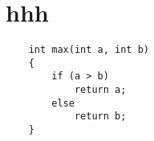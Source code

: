 \chapter{hhh}
\begin{lstlisting}
    int max(int a, int b)
    {
        if (a > b)
            return a;
        else
            return b;
    }
\end{lstlisting}